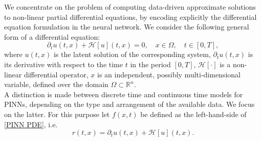 We concentrate on the problem of computing data-driven approximate solutions to non-linear partial differential equations, by encoding explicitly the differential equation formulation in the neural network. We consider the following general form of a differential equation:
\begin{equation}
    \label{PINN PDE}
    \partial_t u(t,x) + \mathcal{H} \left[ u \right] (t, x) = 0, \quad x \in \Omega, \quad t \in \left[ 0, T \right], 
\end{equation}
where $u(t,x)$ is the latent solution of the corresponding system, $\partial_t u(t,x)$ is its derivative with respect to the time $t$ in the period $\left[ 0, T \right]$, $\mathcal{H} \left[ \cdot \right]$ is a non-linear differential operator, $x$ is an independent, possibly multi-dimensional variable, defined over the domain $\Omega \subset \mathbb{R}^{n}$. \\
A distinction is made between discrete time and continuous time models for PINNs, depending on the type and arrangement of the available data. We focus on the latter. For this purpose let $f(x,t)$ be defined as the left-hand-side of \cref{PINN PDE}, i.e.
\begin{equation}
    \label{Residual Network}
    r(t,x) = \partial_t u(t,x) + \mathcal{H} \left[ u \right] (t, x).
\end{equation}
